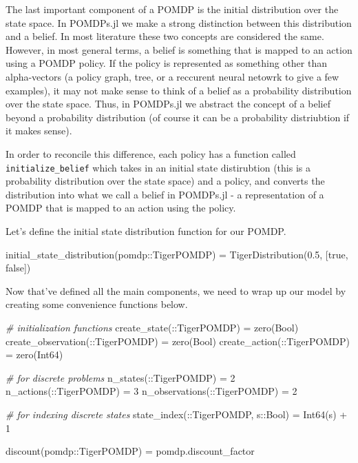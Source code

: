\documentclass[12pt,]{article}
\newenvironment{Shaded}{}{}
\newcommand{\DataTypeTok}[1]{\textcolor[rgb]{0.56,0.13,0.00}{{#1}}}
\newcommand{\FloatTok}[1]{\textcolor[rgb]{0.25,0.63,0.44}{{#1}}}
\newcommand{\CommentTok}[1]{\textcolor[rgb]{0.38,0.63,0.69}{\textit{{#1}}}}
\newcommand{\NormalTok}[1]{{#1}}
\begin{document}
The last important component of a POMDP is the initial distribution over
the state space. In POMDPs.jl we make a strong distinction between this
distribution and a belief. In most literature these two concepts are
considered the same. However, in most general terms, a belief is
something that is mapped to an action using a POMDP policy. If the
policy is represented as something other than alpha-vectors (a policy
graph, tree, or a reccurent neural netowrk to give a few examples), it
may not make sense to think of a belief as a probability distribution
over the state space. Thus, in POMDPs.jl we abstract the concept of a
belief beyond a probability distribution (of course it can be a
probability distriubtion if it makes sense).

In order to reconcile this difference, each policy has a function called
\texttt{initialize\_belief} which takes in an initial state distirubtion
(this is a probability distribution over the state space) and a policy,
and converts the distribution into what we call a belief in POMDPs.jl -
a representation of a POMDP that is mapped to an action using the
policy.

Let's define the initial state distribution function for our POMDP.

\begin{Shaded}
\begin{Highlighting}[]
\NormalTok{initial_state_distribution(pomdp::TigerPOMDP) = TigerDistribution(}\FloatTok{0.5}\NormalTok{, [true, false])}
\end{Highlighting}
\end{Shaded}

Now that've defined all the main components, we need to wrap up our
model by creating some convenience functions below.

\begin{Shaded}
\begin{Highlighting}[]
\CommentTok{# initialization functions}
\NormalTok{create_state(::TigerPOMDP) = zero(}\DataTypeTok{Bool}\NormalTok{)}
\NormalTok{create_observation(::TigerPOMDP) = zero(}\DataTypeTok{Bool}\NormalTok{)}
\NormalTok{create_action(::TigerPOMDP) = zero(}\DataTypeTok{Int64}\NormalTok{)}

\CommentTok{# for discrete problems}
\NormalTok{n_states(::TigerPOMDP) = }\FloatTok{2}
\NormalTok{n_actions(::TigerPOMDP) = }\FloatTok{3}
\NormalTok{n_observations(::TigerPOMDP) = }\FloatTok{2}

\CommentTok{# for indexing discrete states}
\NormalTok{state_index(::TigerPOMDP, s::}\DataTypeTok{Bool}\NormalTok{) = }\DataTypeTok{Int64}\NormalTok{(s) + }\FloatTok{1}

\NormalTok{discount(pomdp::TigerPOMDP) = pomdp.discount_factor}
\end{Highlighting}
\end{Shaded}
\end{document}
